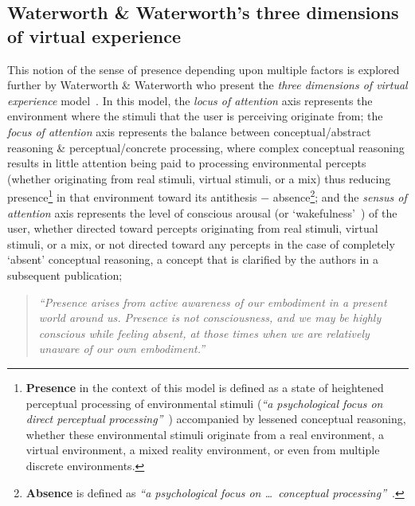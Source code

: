 \subsection{Waterworth \& Waterworth's three dimensions of virtual experience}
\label{waterworthandwaterworth}
\newcommand{\presencefootnote}{\footnote{\textbf{Presence} in the context of this model is defined as a state of heightened perceptual processing of environmental stimuli (\textit{``a psychological focus on direct perceptual processing''}~\cite{Waterworth2001}) accompanied by lessened conceptual reasoning, whether these environmental stimuli originate from a real environment, a virtual environment, a mixed reality environment, or even from multiple discrete environments.}}

\newcommand{\absencefootnote}{\footnote{\textbf{Absence} is defined as \textit{``a psychological focus on \ldots\ conceptual processing''}~\cite{Waterworth2001}.}}

This notion of the sense of presence depending upon multiple factors is explored further by Waterworth \& Waterworth who present the \textit{three dimensions of virtual experience} model~\cite{Waterworth2001}. In this model, the \textit{locus of attention} axis represents the environment where the stimuli that the user is perceiving originate from; the \textit{focus of attention} axis represents the balance between conceptual/abstract reasoning \& perceptual/concrete processing, where complex conceptual reasoning results in little attention being paid to processing environmental percepts (whether originating from real stimuli, virtual stimuli, or a mix) thus reducing presence\presencefootnote{} in that environment toward its antithesis $-$ absence\absencefootnote{}; and the \textit{sensus of attention} axis represents the level of conscious arousal (or `wakefulness'~\cite{Laureys2009}) of the user, whether directed toward percepts originating from real stimuli, virtual stimuli, or a mix, or not directed toward any percepts in the case of completely `absent' conceptual reasoning, a concept that is clarified by the authors in a subsequent publication;

\begin{quote}
	\textit{``Presence arises from active awareness of our embodiment in a present world around us. Presence is not consciousness, and we may be highly conscious while feeling absent, at those times when we are relatively unaware of our own embodiment.''}~\cite{Waterworth2014}
\end{quote}

